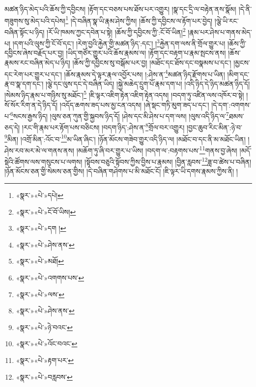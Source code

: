 མཚན་ཉིད་མེད་པའི་ཆོས་ཀྱི་དབྱིངས། །རྟོག་དང་བཅས་པས་ཐོས་པར་འགྱུར། །སྣ་དང་དྲི་ལ་བརྟེན་ནས་སྣོམ། །དེ་ནི་གཟུགས་སུ་མེད་པའི་དཔེས།\footnote{«སྣར་»«པེ་»དཔེ།} །དེ་བཞིན་སྣ་ཡི་རྣམ་ཤེས་ཀྱིས། །ཆོས་ཀྱི་དབྱིངས་ལ་རྟོག་པར་བྱེད། །ལྕེ་ཡི་རང་བཞིན་སྟོང་པ་ཉིད། །རོ་ཡི་ཁམས་ཀྱང་དབེན་པ་སྟེ། །ཆོས་ཀྱི་དབྱིངས་ཀྱི་:ངོ་བོ་ཡིན།\footnote{«སྣར་»«པེ་»ངོ་བོ་ཡིས།} །རྣམ་པར་ཤེས་པ་གནས་མེད་པ། །དག་པའི་ལུས་ཀྱི་ངོ་བོ་དང་། །རེག་བྱའི་རྐྱེན་གྱི་མཚན་ཉིད་:དང་། །\footnote{«སྣར་»«པེ་»དག །}རྐྱེན་དག་ལས་ནི་གྲོལ་གྱུར་པ། །ཆོས་ཀྱི་དབྱིངས་ཞེས་བརྗོད་པར་བྱ། །ཡིད་གཙོར་གྱུར་པའི་ཆོས་རྣམས་ལ། །རྟོག་དང་བརྟག་པ་རྣམ་སྤངས་ནས། །ཆོས་རྣམས་རང་བཞིན་མེད་པ་ཉིད། །ཆོས་ཀྱི་དབྱིངས་སུ་བསྒོམ་པར་བྱ། །མཐོང་དང་ཐོས་དང་བསྣམས་པ་དང་། །མྱངས་དང་རེག་པར་གྱུར་པ་དང་། །ཆོས་རྣམས་དེ་ལྟར་རྣལ་འབྱོར་པས། །:ཤེས་ན་\footnote{«སྣར་»«པེ་»ཤེས་ནས་}མཚན་ཉིད་རྫོགས་པ་ཡིན། །མིག་དང་རྣ་བ་སྣ་དག་དང་། །ལྕེ་དང་ལུས་དང་དེ་བཞིན་ཡིད། །སྐྱེ་མཆེད་དྲུག་པོ་རྣམ་དག་པ། །འདི་ཉིད་དེ་ཉིད་མཚན་ཉིད་དོ། །སེམས་ཉིད་རྣམ་པ་གཉིས་སུ་མཐོང་།\footnote{«སྣར་»«པེ་»མཐོ།} །ཇི་ལྟར་འཇིག་རྟེན་འཇིག་རྟེན་འདས། །བདག་ཏུ་འཛིན་ལས་འཁོར་བ་སྟེ། །སོ་སོར་རིག་ན་དེ་ཉིད་དོ། །འདོད་ཆགས་ཟད་པས་མྱ་ངན་འདས། །ཞེ་སྡང་གཏི་མུག་ཟད་པ་དང་། །དེ་དག་:འགགས་པ་\footnote{«སྣར་»«པེ་»འགགས་པས་}སངས་རྒྱས་ཉིད། །ལུས་ཅན་ཀུན་གྱི་སྐྱབས་ཉིད་དོ། །ཤེས་དང་མི་ཤེས་པ་དག་ལས། །ལུས་འདི་ཉིད་ལ་\footnote{«སྣར་»«པེ་»ལས་}ཐམས་ཅད་དེ། །རང་གི་རྣམ་པར་རྟོག་པས་བཅིངས། །བདག་ཉིད་:ཤེས་ན་\footnote{«སྣར་»«པེ་»ཤེས་ནས་}གྲོལ་བར་འགྱུར། །བྱང་ཆུབ་རིང་མིན་:ཉེ་བ་\footnote{«སྣར་»«པེ་»ཉེ་བའང་}མིན། །འགྲོ་མིན་:འོང་བ་\footnote{«སྣར་»«པེ་»འོང་བའང་}མ་ཡིན་ཞིང་། །ཉོན་མོངས་གཟེབ་གྱུར་འདི་ཉིད་ལ། །མཐོང་བ་དང་ནི་མ་མཐོང་ཡིན། །ཤེས་རབ་མར་མེ་ལ་གནས་ནས། །མཆོག་ཏུ་ཞི་བར་གྱུར་པ་ཡིས། །བདག་ལ་:བརྟགས་པས་\footnote{«སྣར་»«པེ་»རྟག་པར་}གནས་བྱ་ཞེས། །མདོ་སྡེའི་ཚོགས་ལས་གསུངས་པ་ལགས། །སྟོབས་བཅུའི་སྟོབས་ཀྱིས་བྱིས་པ་རྣམས། །བྱིན་རླབས་\footnote{«སྣར་»«པེ་»བརླབས་}ཟླ་བ་ཚེས་པ་བཞིན། །ཉོན་མོངས་ཅན་གྱི་སེམས་ཅན་གྱིས། །དེ་བཞིན་གཤེགས་པ་མི་མཐོང་ངོ། །ཇི་ལྟར་ཡི་དགས་རྣམས་ཀྱིས་ནི། །
